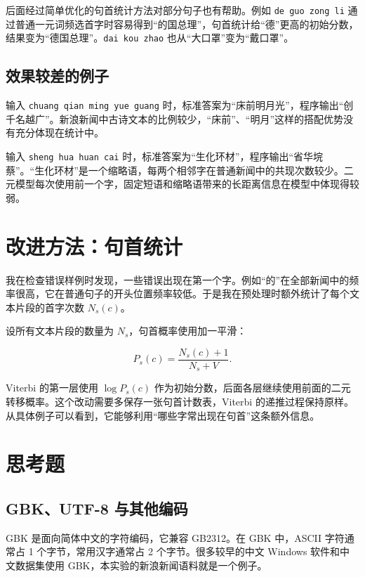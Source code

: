 \documentclass[11pt,a4paper]{ctexart}
\begin{document}
后面经过简单优化的句首统计方法对部分句子也有帮助。例如 \texttt{de guo zong li} 通过普通一元词频选首字时容易得到“的国总理”，句首统计给“德”更高的初始分数，结果变为“德国总理”。\texttt{dai kou zhao} 也从“大口罩”变为“戴口罩”。

\subsection{效果较差的例子}

输入 \texttt{chuang qian ming yue guang} 时，标准答案为“床前明月光”，程序输出“创千名越广”。新浪新闻中古诗文本的比例较少，“床前”、“明月”这样的搭配优势没有充分体现在统计中。

输入 \texttt{sheng hua huan cai} 时，标准答案为“生化环材”，程序输出“省华垸蔡”。“生化环材”是一个缩略语，每两个相邻字在普通新闻中的共现次数较少。二元模型每次使用前一个字，固定短语和缩略语带来的长距离信息在模型中体现得较弱。

\section{改进方法：句首统计}

我在检查错误样例时发现，一些错误出现在第一个字。例如“的”在全部新闻中的频率很高，它在普通句子的开头位置频率较低。于是我在预处理时额外统计了每个文本片段的首字次数 $N_s(c)$。

设所有文本片段的数量为 $N_s$，句首概率使用加一平滑：

\begin{equation}
P_s(c)=\frac{N_s(c)+1}{N_s+V}.
\end{equation}

Viterbi 的第一层使用 $\log P_s(c)$ 作为初始分数，后面各层继续使用前面的二元转移概率。这个改动需要多保存一张句首计数表，Viterbi 的递推过程保持原样。从具体例子可以看到，它能够利用“哪些字常出现在句首”这条额外信息。

\section{思考题}

\subsection{GBK、UTF-8 与其他编码}

GBK 是面向简体中文的字符编码，它兼容 GB2312。在 GBK 中，ASCII 字符通常占 1 个字节，常用汉字通常占 2 个字节。很多较早的中文 Windows 软件和中文数据集使用 GBK，本实验的新浪新闻语料就是一个例子。
\end{document}
